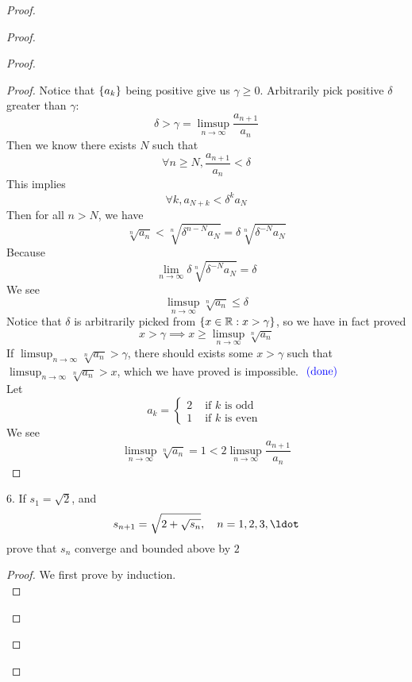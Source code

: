 \documentclass{report}
\begin{document}
\begin{proof}
\begin{proof}
\begin{proof}
\begin{proof}
Notice that $\{ a_k \}$ being positive give us $\gamma \geq 0$. Arbitrarily pick positive $\delta$ greater than $\gamma $:
\begin{equation}
\delta>\gamma =\limsup_{n\to\infty} \frac{a_{n+1}}{a_n}
\end{equation}
Then we know there exists $N$ such that
 \begin{equation}
\forall n\geq N, \frac{a_{n+1}}{a_n}<\delta 
\end{equation}
This implies
\begin{equation}
\forall k,a_{N+k}<\delta^k a_N
\end{equation}
Then for all $n>N$, we have
 \begin{equation}
\sqrt[n]{a_n}<\sqrt[n]{\delta^{n-N}a_N}=\delta \sqrt[n]{\delta^{-N}a_N} 
\end{equation}
Because
\begin{equation}
\lim_{n\to\infty}\delta \sqrt[n]{\delta ^{-N}a_N} =\delta 
\end{equation}
We see
\begin{equation}
\limsup_{n\to\infty} \sqrt[n]{a_n}\leq \delta 
\end{equation}
Notice that $\delta $ is arbitrarily picked from $\{ x\in\mathbb{R}:x>\gamma  \}$, so we have in fact proved
\begin{equation}
x>\gamma \implies x\geq \limsup_{n\to\infty} \sqrt[n]{a_n} 
\end{equation}
If $\limsup_{n\to\infty} \sqrt[n]{a_n} >\gamma $, there should exists some $x>\gamma $ such that $\limsup_{n\to\infty} \sqrt[n]{a_n}>x$, which we have proved is impossible. $\textcolor{blue}{\text{ (done) }}$\\

Let
\begin{equation}
a_k=\begin{cases}
  2& \text{ if  }k\text{ is odd }\\
  1& \text{ if $k$ is even }
\end{cases}
\end{equation}
We see 
\begin{equation}
\limsup_{n\to\infty} \sqrt[n]{a_n}=1 <2\limsup_{n\to\infty} \frac{a_{n+1}}{a_n}
\end{equation}
\end{proof}
\begin{question}{}{}
6. If $s_1 = \sqrt{2}$, and
\begin{equation}
s_{n+1} =  \sqrt{2+\sqrt{s_n}}, \quad n = 1, 2, 3, \ldot
\end{equation}
prove that $s_n$ converge and bounded above by $2$
\end{question}
\begin{proof}
We first prove  by induction.\\


\end{proof}
\end{proof}
\end{proof}
\end{proof}
\end{document}
